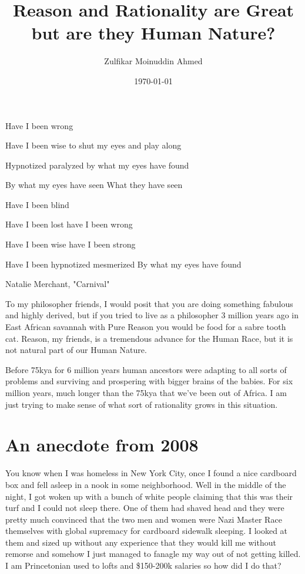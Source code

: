 \documentclass{amsart}
\title{Reason and Rationality are Great but are they Human Nature?}
\author{Zulfikar Moinuddin Ahmed}
\date{\today}
\begin{document}
\maketitle

\epigraph{Have I been wrong

Have I been wise to shut my eyes and play along

Hypnotized paralyzed by what my eyes have found

By what my eyes have seen
What they have seen

Have I been blind

Have I been lost have I been wrong

Have I been wise have I been strong

Have I been hypnotized mesmerized
By what my eyes have found}{Natalie Merchant, "Carnival"}

To my philosopher friends, I would posit that you are doing something fabulous and highly derived, but if you tried to live as a philosopher 3 million years ago in East African savannah with Pure Reason you would be food for a sabre tooth cat.  Reason, my friends, is a tremendous advance for the Human Race, but it is not natural part of our Human Nature.


Before 75kya for 6 million years human ancestors were adapting to all sorts of problems and surviving and prospering with bigger brains of the babies.  For six million years, much longer than the 75kya that we've been out of Africa.  I am just trying to make sense of what sort of rationality grows in this situation.

\section{An anecdote from 2008}

You know when I was homeless in New York City, once I found a nice cardboard box and fell asleep in a nook in some neighborhood.  Well in the middle of the night, I got woken up with a bunch of white people claiming that this was their turf and I could not sleep there.  One of them had shaved head and they were pretty much convinced that the two men and women were Nazi Master Race themselves with global supremacy for cardboard sidewalk sleeping.  I looked at them and sized up without any experience that they would kill me without remorse and somehow I just managed to fanagle my way out of not getting killed.  I am  Princetonian used to lofts and \$150-200k salaries so how did I do that?  
\end{document}
